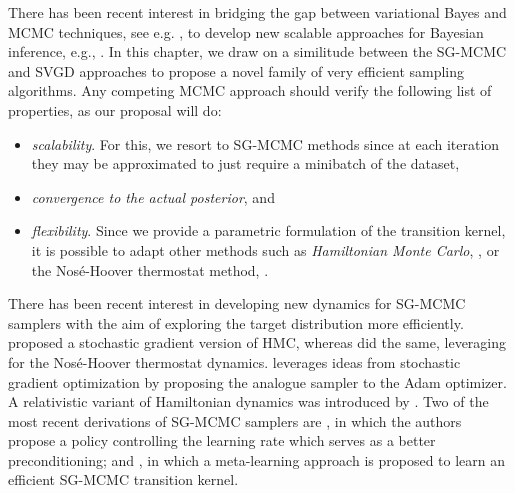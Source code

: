 There has been recent interest in bridging the gap between variational Bayes and MCMC techniques, see e.g. \cite{zhang2018}, to develop new scalable approaches for Bayesian inference, e.g., \cite{carbonetto2012}.
In this chapter, we draw on a similitude between the SG-MCMC and SVGD approaches to propose a novel family of very efficient sampling algorithms. 
Any competing MCMC approach should verify the following list of properties, as our proposal will do:
\begin{itemize}
    \item \emph{scalability}. For this, we resort to SG-MCMC methods since at each iteration they may be approximated to just require a minibatch of the dataset,
    \item \emph{convergence to the actual posterior}, and
    \item \emph{flexibility}. Since we provide a parametric formulation of the transition kernel, it is possible to adapt other methods such as \emph{Hamiltonian Monte Carlo}, \cite{neal2011mcmc}, or the Nos\'e-Hoover thermostat method, \cite{ding2014bayesian}.
\end{itemize}
There has been recent interest in developing new dynamics for SG-MCMC samplers with the aim of exploring the target distribution more efficiently. \cite{chen2014stochastic} proposed a stochastic gradient version of HMC, whereas \cite{ding2014bayesian} did the same, leveraging for the Nos\'e-Hoover thermostat dynamics. \cite{chen2016bridging} leverages ideas from stochastic gradient optimization by proposing the analogue sampler to the Adam optimizer. A relativistic variant of Hamiltonian dynamics was introduced by \cite{abbati2018adageo}. Two of the most recent derivations of SG-MCMC samplers are \cite{zhang2019cyclical}, in which the authors propose a policy controlling the learning rate which serves as a better preconditioning; and \cite{gong2019meta}, in which a meta-learning approach is proposed to learn an efficient SG-MCMC transition kernel.
